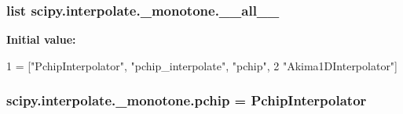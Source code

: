 \subsubsection[{\+\_\+\+\_\+all\+\_\+\+\_\+}]{\setlength{\rightskip}{0pt plus 5cm}list scipy.\+interpolate.\+\_\+monotone.\+\_\+\+\_\+all\+\_\+\+\_\+}\label{namespacescipy_1_1interpolate_1_1__monotone_a995fd4ce36ab357b2cddfa78d1271084}
{\bfseries Initial value\+:}
\begin{DoxyCode}
1 = [\textcolor{stringliteral}{"PchipInterpolator"}, \textcolor{stringliteral}{"pchip\_interpolate"}, \textcolor{stringliteral}{"pchip"},
2            \textcolor{stringliteral}{"Akima1DInterpolator"}]
\end{DoxyCode}
\hypertarget{namespacescipy_1_1interpolate_1_1__monotone_a3130a2af208814c3fea4cd27df32485f}{}
\subsubsection[{pchip}]{\setlength{\rightskip}{0pt plus 5cm}scipy.\+interpolate.\+\_\+monotone.\+pchip = {\bf Pchip\+Interpolator}}\label{namespacescipy_1_1interpolate_1_1__monotone_a3130a2af208814c3fea4cd27df32485f}
